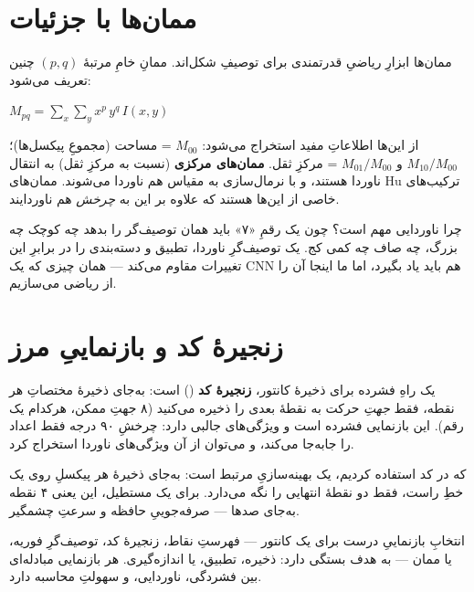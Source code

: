 \documentclass[12pt,a4paper]{article}
\begin{document}
\section{ممان‌ها با جزئیات}

ممان‌ها ابزارِ ریاضیِ قدرتمندی برای توصیفِ شکل‌اند. ممانِ خامِ مرتبهٔ $(p, q)$ چنین تعریف می‌شود:

\begin{riyazi}
$M_{pq} = \sum_x \sum_y x^p\, y^q\, I(x,y)$
\end{riyazi}

از این‌ها اطلاعاتِ مفید استخراج می‌شود: $M_{00}$ = مساحت (مجموعِ پیکسل‌ها)؛ $M_{10}/M_{00}$ و
$M_{01}/M_{00}$ = مرکزِ ثقل. \textbf{ممان‌های مرکزی} (نسبت به مرکزِ ثقل) به انتقال ناوردا هستند، و
با نرمال‌سازی به مقیاس هم ناوردا می‌شوند. ممان‌های Hu ترکیب‌های خاصی از این‌ها هستند که علاوه بر
این به \emph{چرخش} هم ناوردایند.

\begin{nokte}
چرا ناوردایی مهم است؟ چون یک رقمِ «۷» باید همان توصیف‌گر را بدهد چه کوچک چه بزرگ، چه صاف چه کمی
کج. یک توصیف‌گرِ ناوردا، تطبیق و دسته‌بندی را در برابرِ این تغییرات مقاوم می‌کند — همان چیزی که یک
CNN هم باید یاد بگیرد، اما ما اینجا آن را از ریاضی می‌سازیم.
\end{nokte}

\section{زنجیرهٔ کد و بازنماییِ مرز}

یک راهِ فشرده برای ذخیرهٔ کانتور، \textbf{زنجیرهٔ کد} () است: به‌جای ذخیرهٔ مختصاتِ
هر نقطه، فقط \emph{جهتِ} حرکت به نقطهٔ بعدی را ذخیره می‌کنید (۸ جهتِ ممکن، هرکدام یک رقم). این
بازنمایی فشرده است و ویژگی‌های جالبی دارد: چرخشِ ۹۰ درجه فقط اعداد را جابه‌جا می‌کند، و می‌توان از
آن ویژگی‌های ناوردا استخراج کرد.

 که در کد استفاده کردیم، یک بهینه‌سازیِ مرتبط است: به‌جای ذخیرهٔ هر
پیکسلِ روی یک خطِ راست، فقط دو نقطهٔ انتهایی را نگه می‌دارد. برای یک مستطیل، این یعنی ۴ نقطه به‌جای
صدها — صرفه‌جوییِ حافظه و سرعتِ چشمگیر.

\begin{yaddasht}
انتخابِ بازنماییِ درست برای یک کانتور — فهرستِ نقاط، زنجیرهٔ کد، توصیف‌گرِ فوریه، یا ممان — به هدف
بستگی دارد: ذخیره، تطبیق، یا اندازه‌گیری. هر بازنمایی مبادله‌ای بین فشردگی، ناوردایی، و سهولتِ
محاسبه دارد.
\end{yaddasht}
\end{document}
